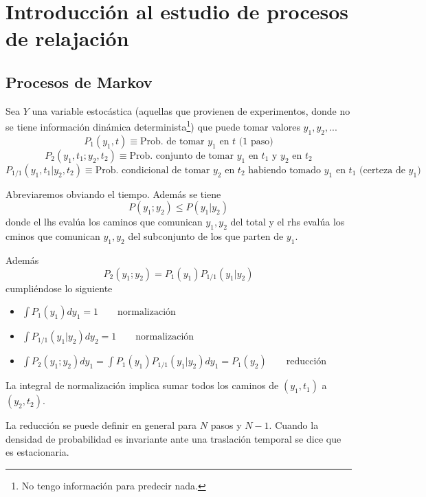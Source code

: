\documentclass[10pt,oneside]{CBFT_book}
\begin{document}
\chapter{Introducción al estudio de procesos de relajación}


\section{Procesos de Markov}

Sea $Y$ una variable estocástica (aquellas que provienen de experimentos, donde no se tiene información
dinámica determinista\footnote{No tengo información para predecir nada.}) 
que puede tomar valores $y_1, y_2,...$
\[
	P_1(y_1,t) \equiv \text{Prob. de tomar $y_1$ en $t$ (1 paso)}
\]
\[
	P_2(y_1,t_1;y_2,t_2) \equiv \text{Prob. conjunto de tomar $y_1$ en $t_1$ y $y_2$ en $t_2$}
\]
\[
	P_{1/1}(y_1,t_1 | y_2, t_2) \equiv \text{Prob. condicional de tomar $y_2$ en $t_2$ habiendo 
	tomado $y_1$ en $t_1$ (certeza de $y_1$) }
\]

Abreviaremos obviando el tiempo. Además se tiene 
\[
	P(y_1;y_2) \leq P(y_1 | y_2)
\]
donde el lhs evalúa los caminos que comunican $y_1, y_2$ del total y el rhs evalúa los cminos que comunican
$y_1, y_2$ del subconjunto de los que parten de $y_1$.

Además
\[
	P_2(y_1;y_2) = P_1(y_1) P_{1/1}(y_1|y_2)
\]
cumpliéndose lo siguiente
\begin{itemize}
 \item $ \int P_1(y_1) dy_1 = 1 \qquad  \text{normalización} $ 
 \item $ \int P_{1/1}(y_1|y_2) dy_2 = 1 \qquad \text{normalización} $ 
 \item $ \int P_2(y_1;y_2) dy_1 = \int P_1(y_1) P_{1/1}(y_1|y_2) dy_1 =  P_1(y_2) \qquad \text{reducción} $
\end{itemize}
La integral de normalización implica sumar todos los caminos de $(y_1,t_1)$ a $(y_2,t_2)$.

La reducción se puede definir en general para $N$ pasos y $N-1$.
Cuando la densidad de probabilidad es invariante ante una traslación temporal se dice que es estacionaria.
\end{document}
